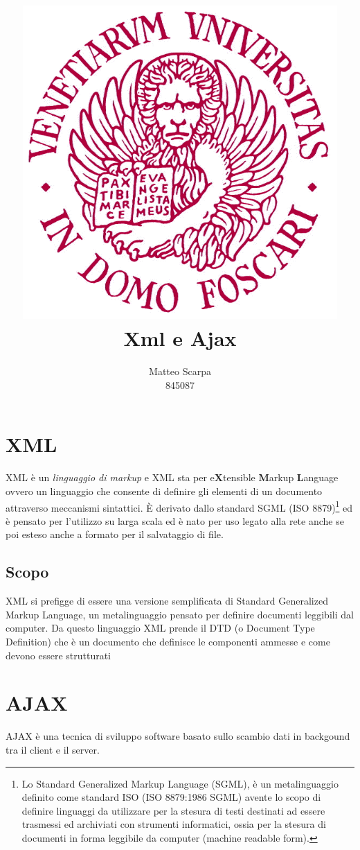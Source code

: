 \documentclass{report}
\title{\includegraphics[width=120mm]{logo-unive.png} \\ Xml e Ajax}
\author{Matteo Scarpa\\ 845087}
\date{}
\begin{document}
\maketitle

\chapter{XML}
XML è un \textit{linguaggio di markup} e XML sta per e\textbf{X}tensible \textbf{M}arkup \textbf{L}anguage ovvero un linguaggio che consente di definire gli elementi di un documento attraverso meccanismi sintattici.
È derivato dallo standard SGML (ISO 8879)\footnote{Lo Standard Generalized Markup Language (SGML), è un metalinguaggio definito come standard ISO (ISO 8879:1986 SGML) avente lo scopo di definire linguaggi da utilizzare per la stesura di testi destinati ad essere trasmessi ed archiviati con strumenti informatici, ossia per la stesura di documenti in forma leggibile da computer (machine readable form).} 
ed è pensato per l'utilizzo su larga scala ed è nato per uso legato alla rete anche se poi esteso anche a formato per il salvataggio di file.

\section{Scopo}
XML si prefigge di essere una versione semplificata di Standard Generalized Markup Language, un metalinguaggio pensato per definire documenti leggibili dal computer. Da questo linguaggio XML prende il DTD (o Document Type Definition) che è un documento che definisce le componenti ammesse e come devono essere strutturati 

\chapter{AJAX}
AJAX è una tecnica di sviluppo software basato sullo scambio dati in backgound tra il client e il server. 

\nocite{w3c}
\printbibliography
\end{document}
